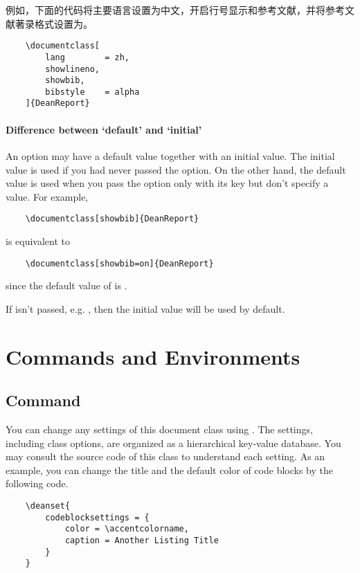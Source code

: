\documentclass[showbib, lang=zh]{DeanReport}
\begin{document}
例如，下面的代码将主要语言设置为中文，开启行号显示和参考文献，并将参考文献著录格式设置为。

\begin{codeblock}[title = 指定文档类选项的示例]
\begin{verbatim}
    \documentclass[
        lang        = zh,
        showlineno,
        showbib,
        bibstyle    = alpha
    ]{DeanReport}
\end{verbatim}
\end{codeblock}

\paragraph{Difference between `default' and `initial'} An option may have a default value together with an initial value. The initial value is used if you had never passed the option. On the other hand, the default value is used when you pass the option only with its key but don't specify a value. For example,
\begin{codeblock*}
\begin{verbatim}
    \documentclass[showbib]{DeanReport}
\end{verbatim}
\end{codeblock*}
is equivalent to 
\begin{codeblock*}
\begin{verbatim}
    \documentclass[showbib=on]{DeanReport}
\end{verbatim}
\end{codeblock*}
since the default value of  is .
\par 
If  isn't passed, e.g. , then the initial value  will be used by default.


\section{Commands and Environments}
\subsection{Command \texorpdfstring{}{deanset} }

You can change any settings of this document class using . The settings, including class options, are organized as a hierarchical key-value database. You may consult the source code of this class to understand each setting. As an example, you can change the title and the default color of code blocks by the following code.
\begin{codeblock*}
\begin{verbatim}
    \deanset{
        codeblocksettings = {
            color = \accentcolorname,
            caption = Another Listing Title
        }
    }
\end{verbatim}
\end{codeblock*}
\end{document}
